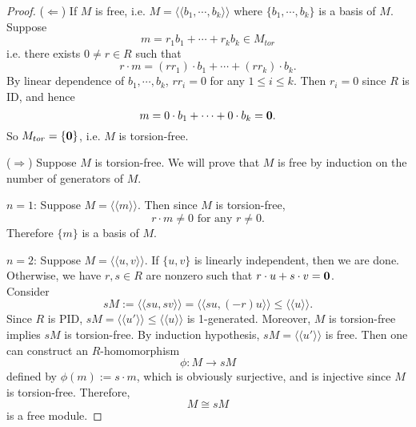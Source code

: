 \documentclass[11pt,openany]{book}
\theoremstyle{plain}
\theoremstyle{definition}
\theoremstyle{remark}
\begin{document}
\begin{proof}
    ($\Leftarrow$) If $M$ is free, i.e. $M=\langle\langle b_1,\cdots,b_k\rangle\rangle$
    where $\{b_1,\cdots,b_k\}$ is a basis of $M$. Suppose 
    $$m=r_1b_1+\cdots+r_kb_k\in M_{tor}$$
    i.e. there exists $0\neq r\in R$ such that
    $$r\cdot m=(rr_1)\cdot b_1+\cdots+(rr_k)\cdot b_k.$$
    By linear dependence of $b_1,\cdots,b_k$, $rr_i=0$ for any $1\leq i\leq k$. Then $r_i=0$ since $R$ is ID, and hence
    $$m=0\cdot b_1+\cdots+0\cdot b_k={\bf 0}.$$
    So $M_{tor}=\{{\bf 0}\}$, i.e. $M$ is torsion-free.

    ($\Rightarrow$) Suppose $M$ is torsion-free. We  will prove that $M$ is free by induction on the number of generators of $M$.

    $n=1$: Suppose $M=\langle\langle m\rangle\rangle$. Then since $M$ is torsion-free,
    $$r\cdot m\neq0\text{ for any }r\neq0.$$
    Therefore $\{m\}$ is a basis of $M$.

    $n=2$: Suppose $M=\langle\langle u,v\rangle\rangle$. If $\{u,v\}$ is linearly independent, then we are done. Otherwise, we have $r,s\in R$ are nonzero such that $r\cdot u+s\cdot v={\bf 0}$.\\
    Consider
    $$sM:=\langle\langle su,sv\rangle\rangle=\langle\langle su,(-r)u\rangle\rangle\leq\langle\langle u\rangle\rangle.$$
    Since $R$ is PID, $sM=\langle\langle u'\rangle\rangle\leq\langle\langle u\rangle\rangle$ is 1-generated. Moreover, $M$ is torsion-free implies $sM$ is torsion-free. By induction hypothesis, $sM=\langle\langle u'\rangle\rangle$ is free. Then one can construct an $R$-homomorphism
    $$\phi: M \to sM$$
    defined by $\phi(m) := s\cdot m$, which is obviously surjective, and is injective since $M$ is torsion-free. Therefore,
    $$M \cong sM$$
    is a free module. 


\end{proof}
\end{document}
